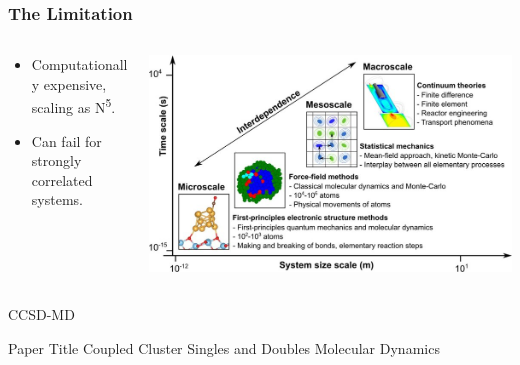 \begin{frame}
    \frametitle{The Limitation}
    \begin{columns}[T]
        \begin{column}{0.45\textwidth}
            \vspace{2cm}
            \begin{itemize}
                \item Computationally expensive, scaling as N\textsuperscript{5}.
                \item Can fail for strongly correlated systems.
            \end{itemize}
        \end{column}
        \begin{column}{0.45\textwidth}
            \includegraphics[width=\textwidth]{images/MP23.png}
        \end{column}
    \end{columns}
\end{frame}


\begin{frame}{CCSD-MD}
	\begin{block}{Paper Title}
	Coupled Cluster Singles and Doubles Molecular Dynamics
	\end{block}
\end{frame}

